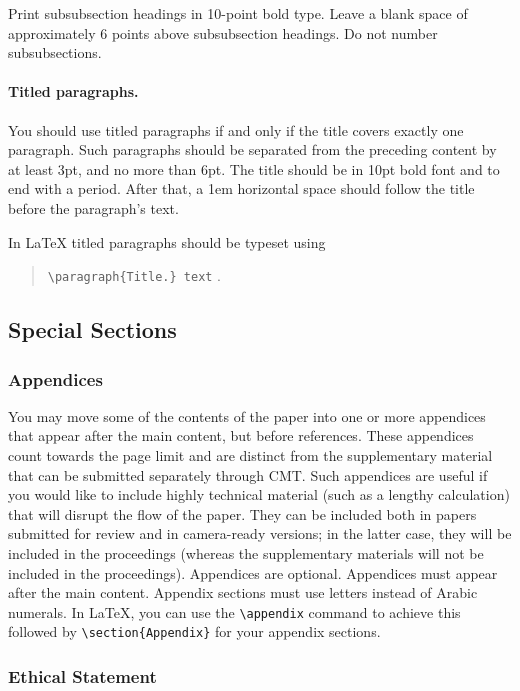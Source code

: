 \documentclass{article}
\begin{document}
Print subsubsection headings in 10-point bold type. Leave a blank
space of approximately 6 points above subsubsection headings. Do not
number subsubsections.

\paragraph{Titled paragraphs.} You should use titled paragraphs if and
only if the title covers exactly one paragraph. Such paragraphs should be
separated from the preceding content by at least 3pt, and no more than
6pt. The title should be in 10pt bold font and to end with a period.
After that, a 1em horizontal space should follow the title before
the paragraph's text.

In \LaTeX{} titled paragraphs should be typeset using
\begin{quote}
    {\tt \textbackslash{}paragraph\{Title.\} text} .
\end{quote}

\subsection{Special Sections}

\subsubsection{Appendices}
You may move some of the contents of the paper into one or more appendices that appear after the main content, but before references. These appendices count towards the page limit and are distinct from the supplementary material that can be submitted separately through CMT. Such appendices are useful if you would like to include highly technical material (such as a lengthy calculation) that will disrupt the flow of the paper. They can be included both in papers submitted for review and in camera-ready versions; in the latter case, they will be included in the proceedings (whereas the supplementary materials will not be included in the proceedings).
Appendices are optional. Appendices must appear after the main content.
Appendix sections must use letters instead of Arabic numerals. In \LaTeX,  you can use the {\tt \textbackslash{}appendix} command to achieve this followed by  {\tt \textbackslash section\{Appendix\}} for your appendix sections.

\subsubsection{Ethical Statement}
\end{document}
